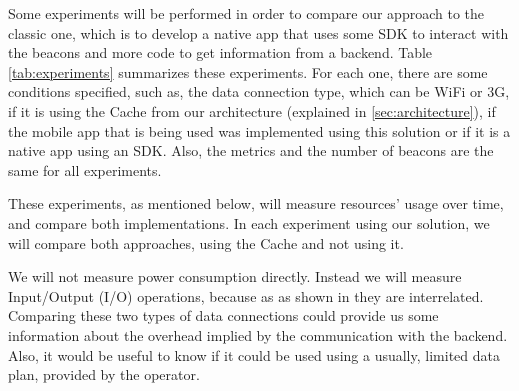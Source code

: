 Some experiments will be performed in order to compare
our approach to the classic one, which is to develop a
native app that uses some SDK to interact with the beacons
and more code to get information from a backend.
Table \ref{tab:experiments} summarizes these experiments.
For each one, there are some conditions specified, such as,
the data connection type, which can be WiFi or 3G, if
it is using the Cache from our architecture (explained in 
\ref{sec:architecture}), if the mobile app that is being
used was implemented using this solution or if it is
a native app using an SDK. 
Also, the metrics and the number of beacons
are the same for all experiments.



These experiments, as mentioned below, 
will measure resources' usage over time, 
and compare both implementations. In each
experiment using our solution, we will
compare both approaches, using the Cache
and not using it.

We will not measure power consumption directly.
Instead we will measure Input/Output (I/O)
operations, because as as shown in 
\cite{Pathak2012} they are interrelated.
Comparing these
two types of data connections could provide us
some information about the
overhead implied by the communication with
the backend. Also, it would be useful to
know if it could be used using
a usually, limited data plan, provided by
the operator.

